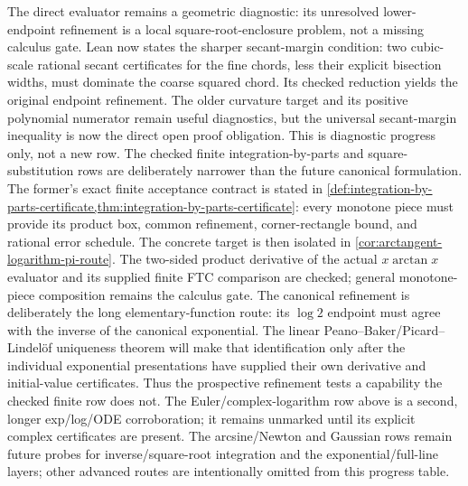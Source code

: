 The direct  evaluator remains a geometric diagnostic:
its unresolved lower-endpoint refinement is a local square-root-enclosure
problem, not a missing calculus gate.  Lean now states the sharper secant-margin
condition: two cubic-scale rational secant certificates for the fine chords,
less their explicit bisection widths, must dominate the coarse squared chord.
Its checked reduction yields the original endpoint refinement.  The older
curvature target and its positive polynomial numerator remain useful
diagnostics, but the universal secant-margin inequality is now the direct open
proof obligation.  This is diagnostic progress only, not a new row.
The checked finite integration-by-parts and square-substitution rows are
deliberately narrower than the future canonical formulation.  The former's
exact finite acceptance contract is stated in
\cref{def:integration-by-parts-certificate,thm:integration-by-parts-certificate}:
every monotone piece must provide its product box, common refinement,
corner-rectangle bound, and rational error schedule.  The concrete target is
then isolated in \cref{cor:arctangent-logarithm-pi-route}.  The two-sided product derivative
of the actual \(x\arctan x\) evaluator and its supplied finite FTC comparison
are checked; general monotone-piece composition remains the calculus gate.
The canonical refinement is deliberately the long elementary-function route:
its \(\log 2\) endpoint must agree with the inverse
of the canonical exponential.  The linear Peano--Baker/Picard--Lindel\"of
uniqueness theorem will make that identification only after the individual
exponential presentations have supplied their own derivative and initial-value
certificates.  Thus the prospective refinement tests a capability the checked
finite row does not.
The Euler/complex-logarithm row above is a second, longer exp/log/ODE
corroboration; it remains unmarked until its explicit complex certificates are
present.  The arcsine/Newton and Gaussian rows remain future probes for
inverse/square-root integration and the exponential/full-line layers; other
advanced routes are intentionally omitted from this progress table.

